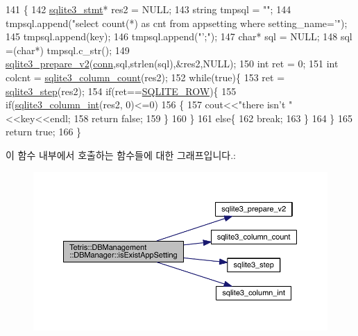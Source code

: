 \begin{DoxyCode}
141                                               \{
142                 \hyperlink{sqlite3_8h_af2a033da1327cdd77f0a174a09aedd0c}{sqlite3\_stmt}* res2 = NULL;
143                 \textcolor{keywordtype}{string} tmpsql = \textcolor{stringliteral}{""};
144                 tmpsql.append(\textcolor{stringliteral}{"select count(*) as cnt from appsetting where setting\_name='"});
145                 tmpsql.append(key);
146                 tmpsql.append(\textcolor{stringliteral}{"';"});
147                 \textcolor{keywordtype}{char}* sql = NULL;
148                 sql =(\textcolor{keywordtype}{char}*) tmpsql.c\_str();
149                 \hyperlink{sqlite3_8h_a85d4203bb54c984c5325c2f5b3664985}{sqlite3\_prepare\_v2}(\hyperlink{class_tetris_1_1_d_b_management_1_1_d_b_manager_acc2c19420c2b1b1b2c1e724b3a8ec4b7}{conn},sql,strlen(sql),&res2,NULL);
150                 \textcolor{keywordtype}{int} ret = 0;
151                 \textcolor{keywordtype}{int} colcnt = \hyperlink{sqlite3_8h_a326cbde878820fd108f5961d5318f585}{sqlite3\_column\_count}(res2);
152                 \textcolor{keywordflow}{while}(\textcolor{keyword}{true})\{
153                     ret = \hyperlink{sqlite3_8h_ac1e491ce36b7471eb28387f7d3c74334}{sqlite3\_step}(res2);
154                     \textcolor{keywordflow}{if}(ret==\hyperlink{sqlite3_8h_a624365823d0b11a99ccb49e9bb5f8fcf}{SQLITE\_ROW})\{
155                         \textcolor{keywordflow}{if}(\hyperlink{sqlite3_8h_a6bd16f5b3266f473e37e8e3d4ebb4290}{sqlite3\_column\_int}(res2, 0)<=0)
156                         \{
157                             cout<<\textcolor{stringliteral}{"there isn't "}<<key<<endl;
158                             \textcolor{keywordflow}{return} \textcolor{keyword}{false};
159                         \}
160                     \}
161                     \textcolor{keywordflow}{else}\{
162                         \textcolor{keywordflow}{break};
163                     \}
164                 \}
165                 \textcolor{keywordflow}{return} \textcolor{keyword}{true};
166             \}
\end{DoxyCode}
이 함수 내부에서 호출하는 함수들에 대한 그래프입니다.\+:
\nopagebreak
\begin{figure}[H]
\begin{center}
\leavevmode
\includegraphics[width=350pt]{da/d79/class_tetris_1_1_d_b_management_1_1_d_b_manager_aa80722572c33389c1c73f88de9f199b6_cgraph}
\end{center}
\end{figure}
